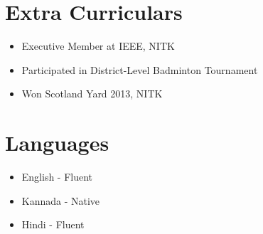 \documentclass[10pt]{article} %
\begin{document}

\section{Extra Curriculars}
\begin{itemize}
\item{Executive Member at IEEE, NITK} 
\item{Participated in District-Level Badminton Tournament} 
\item{Won Scotland Yard 2013, NITK} 
\end{itemize}



\section{Languages}

\begin{itemize}
\item{English - Fluent} 
\item{Kannada - Native} 
\item{Hindi   - Fluent} 
\end{itemize}

\end{document}
